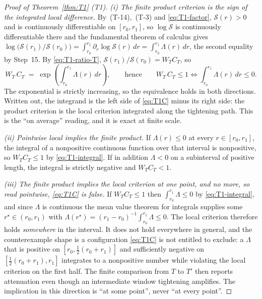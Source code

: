 \documentclass[11pt]{article}
\begin{document}
\begin{proof}[Proof of Theorem~\ref{thm:T1} (T1)]
\emph{(i) The finite product criterion is the sign of the integrated local difference.} By~(T-14),~(T-3)
and \eqref{eq:T1-factor}, $\mathcal S(r) > 0$ and is continuously differentiable on $[r_0,r_1]$, so
$\log\mathcal S$ is continuously differentiable there and the fundamental theorem of calculus gives
$\log\bigl(\mathcal S(r_1)/\mathcal S(r_0)\bigr) = \int_{r_0}^{r_1}\partial_r\log\mathcal S(r)\,dr
= \int_{r_0}^{r_1}\Lambda(r)\,dr$, the second equality by Step~15. By \eqref{eq:T1-ratio-T},
$\mathcal S(r_1)/\mathcal S(r_0) = W_T C_T$, so
\begin{equation}
\label{eq:T1-integral}
W_T\,C_T \;=\; \exp\!\left(\int_{r_0}^{r_1}\Lambda(r)\,dr\right),
\qquad\text{hence}\qquad
W_T\,C_T \le 1 \iff \int_{r_0}^{r_1}\Lambda(r)\,dr \le 0 .
\end{equation}
The exponential is strictly increasing, so the equivalence holds in both directions. Written out,
the integrand is the left side of \eqref{eq:T1C} minus its right side: the product criterion is
the local criterion integrated along the tightening path. This is the ``on average'' reading, and
it is exact at finite scale.

\emph{(ii) Pointwise local implies the finite product.} If $\Lambda(r) \le 0$ at every
$r \in [r_0,r_1]$, the integral of a nonpositive continuous function over that interval is
nonpositive, so $W_T C_T \le 1$ by \eqref{eq:T1-integral}. If in addition $\Lambda < 0$ on a
subinterval of positive length, the integral is strictly negative and $W_T C_T < 1$.

\emph{(iii) The finite product implies the local criterion at one point, and no more, so read
pointwise, \eqref{eq:T1C} is false.} If $W_T C_T \le 1$ then $\int_{r_0}^{r_1}\Lambda \le 0$ by
\eqref{eq:T1-integral}, and since $\Lambda$ is continuous the mean value theorem for integrals
supplies some $r^\star \in (r_0,r_1)$ with
$\Lambda(r^\star) = (r_1-r_0)^{-1}\int_{r_0}^{r_1}\Lambda \le 0$. The local criterion therefore
holds \emph{somewhere} in the interval. It does not hold everywhere in general, and the
counterexample shape is a configuration \eqref{eq:T1C} is not entitled to exclude: a $\Lambda$ that
is positive on $[r_0,\tfrac12(r_0+r_1)]$ and sufficiently negative on $[\tfrac12(r_0+r_1),r_1]$
integrates to a nonpositive number while violating the local criterion on the first half. The
finite comparison from $T$ to $T'$ then reports attenuation even though an intermediate window
tightening amplifies. The implication in this direction is ``at some point'', never ``at every
point''.


\end{proof}
\end{document}
